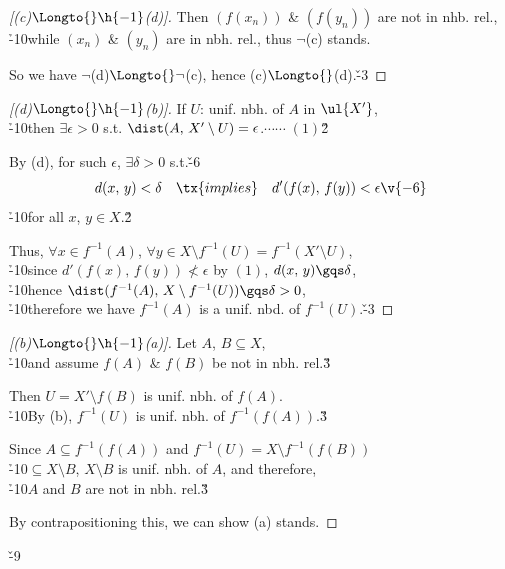 \documentclass[dvipdfmx,a4paper,titlepage,9pt]{jsarticle}
\begin{document}
\begin{multicols*}{2}
\begin{itemize}[label=-]
\begin{pfbox}
\begin{proof}[{[(c)${}\Longto{}\h{-1}$(d)]}]
Then $(f(x_n))$ \& $(f(y_n))$ are not in nhb. rel., \\
\h{-10}while $(x_n)$ \& $(y_n)$ are in nbh. rel., thus $\neg$(c) stands.

So we have $\neg$(d)${}\Longto{}\neg$(c), hence (c)${}\Longto{}$(d).\v{-3}
\end{proof}

\dotfill

\begin{proof}[{[(d)${}\Longto{}\h{-1}$(b)]}]
If $U$: unif. nbh. of $A$ in $\ul{X'}$,\\
\h{-10}then $\exists\epsilon>0$ s.t. $\dist(A,\,X'\setminus U)=\epsilon$.\hfill$\cdots\cdots\;(1)$\v2

By (d), for such $\epsilon$, $\exists\delta>0$ s.t.\v{-6}
$$d(x,\,y)<\delta\quad\tx{implies}\quad d'(f(x),\,f(y))<\epsilon\v{-6}$$
\h{-10}for all $x$, $y\in X$.\v2

Thus, $\forall x\in f^{-1}(A)$, $\forall y\in X\setminus f^{-1}(U)=f^{-1}(X'\setminus U)$,\\
\h{-10}since $d'(f(x),\,f(y))\not<\epsilon$ by $(1)$, $d(x,\,y)\gqs\delta$, \\
\h{-10}hence $\dist(f^{-1}(A),\,X\setminus f^{-1}(U))\gqs\delta>0$,\\
\h{-10}therefore we have $f^{-1}(A)$ is a unif. nbd. of $f^{-1}(U)$.\v{-3}
\end{proof}

\dotfill\rnc{\qedsymbol}{\Bsq}

\begin{proof}[{[(b)${}\Longto{}\h{-1}$(a)]}]
Let $A$, $B\subseteq X$,\\
\h{-10}and assume $f(A)$ \& $f(B)$ be not in nbh. rel.\v3

Then $U=X'\setminus f(B)$ is unif. nbh. of $f(A)$.\\
\h{-10}By (b), $f^{-1}(U)$ is unif. nbh. of $f^{-1}(f(A))$.\v3

Since $A\subseteq f^{-1}(f(A))$ and $f^{-1}(U)=X\setminus f^{-1}(f(B))$\\
\h{-10}$\subseteq X\setminus B$, $X\setminus B$ is unif. nbh. of $A$, and therefore,\\
\h{-10}$A$ and $B$ are not in nbh. rel.\v3

By contrapositioning this, we can show (a) stands.
\end{proof}
\end{pfbox}
\end{itemize}\v{-9}

\newpage


\end{multicols*}
\end{document}
